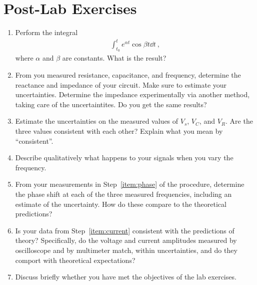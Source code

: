 \documentclass[12pt]{article}
\begin{document}
\newpage

\section*{Post-Lab Exercises}

\begin{enumerate}
\item Perform the integral 
  \begin{gather*}
    \int_{t_0}^t e^{\alpha t} \cos\beta t \dd t\ ,
  \end{gather*}
  where $\alpha$ and $\beta$ are constants.  What is the result?
\item From you measured resistance, capacitance, and frequency, determine
  the reactance and impedance of your circuit.  Make sure to estimate
  your uncertainties.  Determine the impedance experimentally via
  another method, taking care of the uncertaintites.%
  Do you get the same results?  
\item Estimate the uncertainties on the measured values of $V_s$,
  $V_C$, and $V_R$.  Are the three values consistent with each other?
  Explain what you mean by ``consistent''.
\item Describe qualitatively what happens to your signals when you
  vary the frequency.
\item From your measurements in Step~\ref{item:phase} of the
  procedure, determine the phase shift at each of the three measured
  frequencies, including an estimate of the uncertainty.  How do these
  compare to the theoretical predictions? 
\item Is your data from Step~\ref{item:current} consistent with the
  predictions of theory?  Specifically, do the voltage and current
  amplitudes measured by oscilloscope and by multimeter match, within
  uncertainties, and do they comport with theoretical expectations?
\item Discuss briefly whether you have met the objectives of the lab
  exercises.
\end{enumerate}
\end{document}
